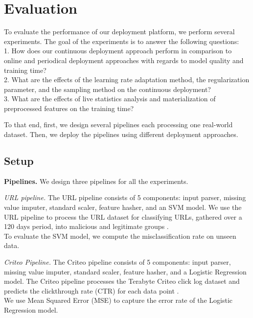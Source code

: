 \section{Evaluation} \label{evaluation} 
To evaluate the performance of our deployment platform, we perform several experiments.
The goal of the experiments is to answer the following questions:\\
1. How does our continuous deployment approach perform in comparison to online and periodical deployment approaches with regards to model quality and training time? \\
2. What are the effects of the learning rate adaptation method, the regularization parameter, and the sampling method on the continuous deployment? \\
3. What are the effects of live statistics analysis and materialization of preprocessed features on the training time?

To that end, first, we design several pipelines each processing one real-world dataset.
Then, we deploy the pipelines using different deployment approaches.

\subsection{Setup}\label{subsec:setup}
\textbf{Pipelines.}
We design three pipelines for all the experiments.

\textit{URL pipeline. } The URL pipeline consists of 5 components: input parser, missing value imputer, standard scaler, feature hasher, and an SVM model.
We use the URL pipeline to process the URL dataset for classifying URLs, gathered over a 120 days period, into malicious and legitimate groups \cite{ma2009identifying}.\\
To evaluate the SVM model, we compute the misclassification rate on unseen data.

\textit{Criteo Pipeline.} 
The Criteo pipeline consists of 5 components: input parser, missing value imputer, standard scaler, feature hasher, and a Logistic Regression model.
The Criteo pipeline processes the Terabyte Criteo click log dataset and predicts the clickthrough rate (CTR) for each data point \cite{criteo-log}.\\
We use Mean Squared Error (MSE) to capture the error rate of the Logistic Regression model.


